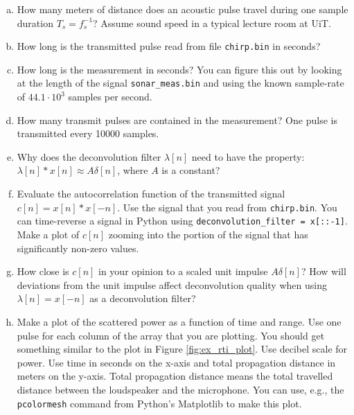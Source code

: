 \begin{enumerate}[a)]
\item How many meters of distance does an acoustic pulse travel during one sample duration $T_s = f_s^{-1}$? Assume sound speed in a typical lecture room at UiT.

  \item How long is the transmitted pulse read from file \verb|chirp.bin| in seconds?  

  \item How long is the measurement in seconds? You can figure this out by looking at the length of the signal \verb|sonar_meas.bin| and using the known sample-rate of $44.1 \cdot 10^3$ samples per second.
    
  \item How many transmit pulses are contained in the measurement? One
    pulse is transmitted every 10000 samples.
    
 \item Why does the deconvolution filter $\lambda[n]$ need to have the
  property: $\lambda[n]*x[n] \approx A\delta[n]$, where $A$ is a
  constant?
   
 \item Evaluate the autocorrelation function of the transmitted signal
   $c[n]=x[n]*x[-n]$. Use the signal that you read from
   \verb|chirp.bin|. You can time-reverse a signal in Python using
   \verb|deconvolution_filter = x[::-1]|. Make a plot of $c[n]$
   zooming into the portion of the signal that has significantly
   non-zero values.

 \item How close is $c[n]$ in your opinion to a scaled unit
   impulse $A\delta[n]$? How will deviations from the unit impulse
   affect deconvolution quality when using $\lambda[n]=x[-n]$ as a
   deconvolution filter?

 \item Make a plot of the scattered power as a function of time and
   range. Use one pulse for each column of the array that you are
   plotting.  You should get something similar to the plot in Figure
   \ref{fig:ex_rti_plot}. Use decibel scale for power. Use time in
   seconds on the x-axis and total propagation distance in meters on
   the y-axis. Total propagation distance means the total travelled
   distance between the loudspeaker and the microphone. You can use,
   e.g., the \verb|pcolormesh| command from Python's Matplotlib to
   make this plot.


\end{enumerate}
